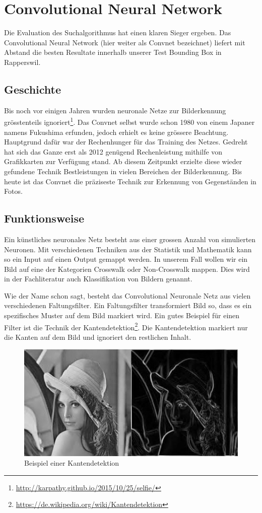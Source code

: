 \section{Convolutional Neural Network}
Die Evaluation des Suchalgorithmus hat einen klaren Sieger ergeben. Das Convolutional Neural Network (hier weiter als Convnet bezeichnet) liefert mit Abstand die besten Resultate innerhalb unserer Test Bounding Box in Rapperswil.

\subsection{Geschichte}
Bis noch vor einigen Jahren wurden neuronale Netze zur Bilderkennung grösstenteils ignoriert\footnote{\url{http://karpathy.github.io/2015/10/25/selfie/}}. Das Convnet selbst wurde schon 1980 von einem Japaner namens Fukushima erfunden, jedoch erhielt es keine grössere Beachtung. Hauptgrund dafür war der Rechenhunger für das Training des Netzes. Gedreht hat sich das Ganze erst als 2012 genügend Rechenleistung mithilfe von Grafikkarten zur Verfügung stand. Ab diesem Zeitpunkt erzielte diese wieder gefundene Technik Bestleistungen in vielen Bereichen der Bilderkennung. Bis heute ist das Convnet die präziseste Technik zur Erkennung von Gegenständen in Fotos.

\subsection{Funktionsweise}
Ein künstliches neuronales Netz besteht aus einer grossen Anzahl von simulierten Neuronen. Mit verschiedenen Techniken aus der Statistik und  Mathematik kann so ein Input auf einen Output gemappt werden. In unserem Fall wollen wir ein Bild auf eine der Kategorien Crosswalk oder Non-Crosswalk mappen. Dies wird in der Fachliteratur auch Klassifikation von Bildern genannt.

Wie der Name schon sagt, besteht das Convolutional Neuronale Netz aus vielen verschiedenen Faltungsfilter. Ein Faltungsfilter transformiert Bild so, dass es ein spezifisches Muster auf dem Bild markiert wird. Ein gutes Beispiel für einen Filter ist die Technik der Kantendetektion\footnote{\url{https://de.wikipedia.org/wiki/Kantendetektion}}. Die Kantendetektion markiert nur die Kanten auf dem Bild und ignoriert den restlichen Inhalt.

\begin{figure}[H]
	\includegraphics[width=\textwidth]{images/kantendetektion.jpg}
	\caption{Beispiel einer Kantendetektion}
\end{figure}


